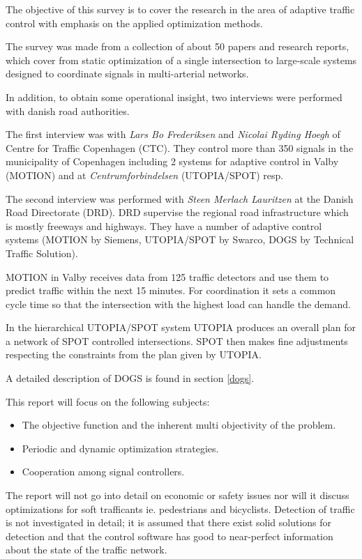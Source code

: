 \label{scope}
The objective of this survey is to cover the research in the area of adaptive traffic control with emphasis on the applied optimization methods.

The survey was made from a collection of about 50 papers and research reports, which cover from static optimization of a single intersection to large-scale systems designed to coordinate signals in multi-arterial networks. 

In addition, to obtain some operational insight, two interviews were performed with danish road authorities. 

The first interview was with \textit{Lars Bo Frederiksen} and \textit{Nicolai Ryding Hoegh} of Centre for Traffic Copenhagen (CTC). They control more than 350 signals in the municipality of Copenhagen including 2 systems for adaptive control in Valby (MOTION) and at \textit{Centrumforbindelsen} (UTOPIA/SPOT) resp. 

The second interview was performed with \textit{Steen Merlach Lauritzen} at the Danish Road Directorate (DRD). DRD supervise the regional road infrastructure which is mostly freeways and highways. They have a number of adaptive control systems (MOTION by Siemens, UTOPIA/SPOT by Swarco, DOGS by Technical Traffic Solution).

MOTION in Valby receives data from 125 traffic detectors and use them to predict traffic within the next 15 minutes. For coordination it sets a common cycle time so that the intersection with the highest load can handle the demand.

In the hierarchical UTOPIA/SPOT system UTOPIA produces an overall plan for a network of SPOT controlled intersections. SPOT then makes fine adjustments respecting the constraints from the plan given by UTOPIA.

A detailed description of DOGS is found in section \ref{dogs}.

This report will focus on the following subjects:

\begin{itemize}
\item The objective function and the inherent multi objectivity of the problem.
\item Periodic and dynamic optimization strategies.
\item Cooperation among signal controllers.
\end{itemize}

The report will not go into detail on economic or safety issues nor will it discuss optimizations for soft trafficants ie. pedestrians and bicyclists. Detection of traffic is not investigated in detail; it is assumed that there exist solid solutions for detection and that the control software has good to near-perfect information about the state of the traffic network.
